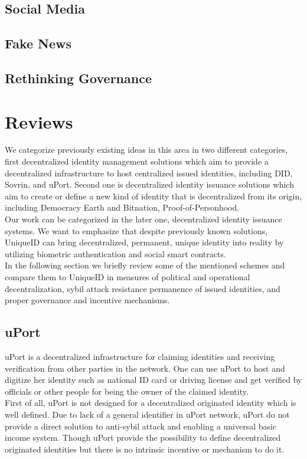 \documentclass{article}
\begin{document}
\subsection{Social Media}
\subsection{Fake News}
\subsection{Rethinking Governance}

\section{Reviews}
We categorize previously existing ideas in this area in two different categories, first decentralized identity management solutions which aim to provide a decentralized infrastructure to host centralized issued identities, including DID, Sovrin, and uPort. Second one is decentralized identity issuance solutions which aim to create or define a new kind of identity that is decentralized from its origin, including Democracy Earth and Bitnation, Proof-of-Personhood.\\
Our work can be categorized in the later one, decentralized identity issuance systems. We want to emphasize that despite previously known solutions, UniqueID can bring decentralized, permanent, unique identity into reality by utilizing biometric authentication and social smart contracts. \\
In the following section we briefly review some of the mentioned schemes and compare them to UniqueID in measures of political and operational decentralization, sybil attack resistance  permanence of issued identities, and proper governance and incentive mechanisms. 

\subsection{uPort}

uPort is a decentralized infrastructure for claiming identities and receiving verification from other parties in the network. One can use uPort to host and digitize her identity such as national ID card or driving license and get verified by officials or other people for being the owner of the claimed identity.\\
 First of all, uPort is not designed for a decentralized originated identity which is well defined. Due to lack of a general identifier in uPort network, uPort do not provide a direct solution to anti-sybil attack and enabling a universal basic income system. Though uPort provide the possibility to define decentralized originated identities but there is no intrinsic incentive or mechanism to do it.
\end{document}
